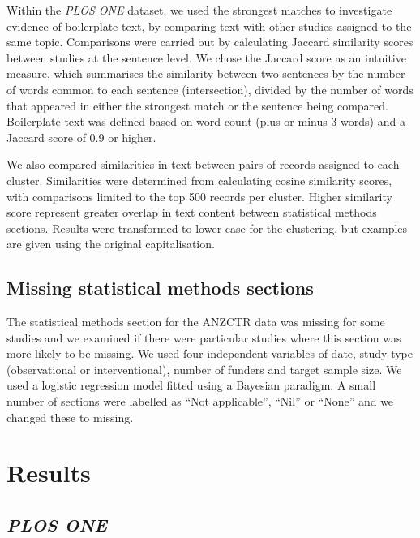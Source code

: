 \documentclass[12pt]{article}
\begin{document}
Within the \emph{PLOS ONE} dataset, we used the strongest matches to
investigate evidence of boilerplate text, by comparing text with other
studies assigned to the same topic. Comparisons were carried out by
calculating Jaccard similarity scores between studies at the sentence
level. We chose the Jaccard score as an intuitive measure, which
summarises the similarity between two sentences by the number of words
common to each sentence (intersection), divided by the number of words
that appeared in either the strongest match or the sentence being
compared. Boilerplate text was defined based on word count (plus or
minus 3 words) and a Jaccard score of 0.9 or higher.

We also compared similarities in text between pairs of records assigned
to each cluster. Similarities were determined from calculating cosine
similarity scores, with comparisons limited to the top 500 records per
cluster. Higher similarity score represent greater overlap in text
content between statistical methods sections. Results were transformed
to lower case for the clustering, but examples are given using the
original capitalisation.

\subsection{Missing statistical methods sections}

The statistical methods section for the ANZCTR data was missing for some
studies and we examined if there were particular studies where this
section was more likely to be missing. We used four independent
variables of date, study type (observational or interventional), number
of funders and target sample size. We used a logistic regression model
fitted using a Bayesian paradigm. A small number of sections were
labelled as ``Not applicable'', ``Nil'' or ``None'' and we changed these
to missing.

\hypertarget{results}{%
\section{Results}\label{results}}

\hypertarget{plos-one}{%
\subsection{\texorpdfstring{\emph{PLOS ONE}}{PLOS ONE}}\label{plos-one}}
\end{document}
